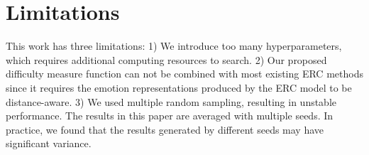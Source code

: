 \documentclass[11pt]{article}
\begin{document}
\section*{Limitations}

This work has three limitations: 1) We introduce too many hyperparameters, which requires additional computing resources to search. 2) Our proposed difficulty measure function can not be combined with most existing ERC methods since it requires the emotion representations produced by the ERC model to be distance-aware. 3) We used multiple random sampling, resulting in unstable performance. The results in this paper are averaged with multiple seeds. In practice, we found that the results generated by different seeds may have significant variance.






\end{document}
